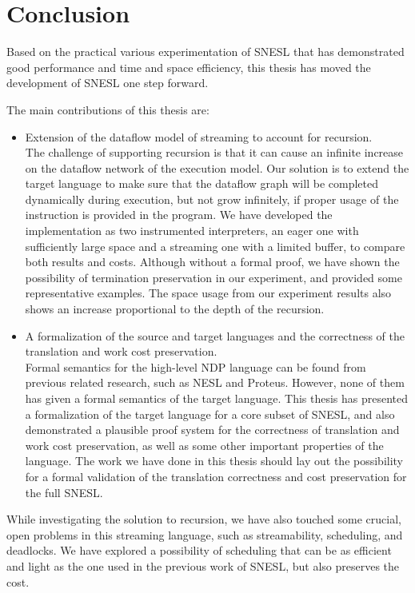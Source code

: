 \chapter{Conclusion}
Based on the practical various experimentation of SNESL that has demonstrated good performance and time and space efficiency, this thesis has moved  the development of SNESL one step forward. 

The main contributions of this thesis are:
\begin{itemize}
	\item Extension of the dataflow model of streaming to account for recursion. \\
	The challenge of supporting recursion is that it can cause an infinite increase on the dataflow network of the execution model.
	Our solution is to extend the target language to make sure that the dataflow graph will be completed dynamically during execution, but not grow infinitely, if proper usage  of the \wc instruction is provided in the program. 
	We have developed the implementation as two instrumented interpreters, an eager one with sufficiently large space  and a streaming one with a limited buffer,  to compare both results and costs. 
	Although without a formal proof, we have shown the possibility of termination preservation in our experiment, and provided some representative examples.
	The space usage from our experiment results also shows an increase proportional to the depth of the recursion. 
\item A formalization of the source and target languages and the correctness of the translation and work cost preservation.  \\
Formal semantics for the high-level NDP language can be found from previous related research, such as NESL and Proteus. However, none of them has given a formal semantics of the target language. 
This thesis has presented a formalization of the target language for a core subset of SNESL, and also demonstrated a plausible proof system for the correctness of translation and work cost preservation, as well as some other important properties of the language.
The work we have done in this thesis should lay out the possibility for a formal validation of the translation correctness and cost preservation for the full SNESL.
\end{itemize}

While investigating the solution to recursion, we have also touched some crucial, open problems in this streaming language,  such as streamability, scheduling, and deadlocks. 
We have explored a possibility of scheduling that can be as efficient and light as the one used in the previous work of SNESL, but also preserves the cost.

